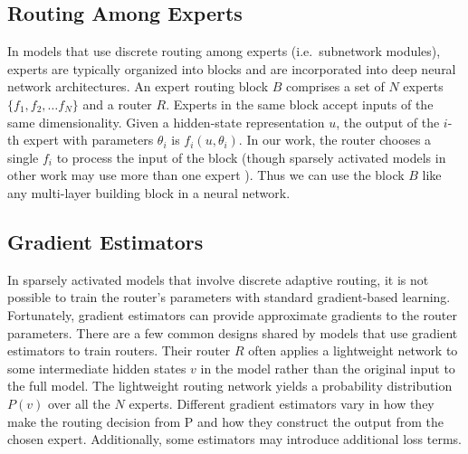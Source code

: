 \documentclass{article}
\theoremstyle{plain}
\theoremstyle{definition}
\theoremstyle{remark}
\begin{document}
\subsection{Routing Among Experts}

In models that use discrete routing among experts (i.e.\ subnetwork modules), experts are typically organized into blocks and are incorporated into deep neural network architectures. 
An expert routing block $B$ comprises a set of $N$ experts $\{f_1, f_2, \dots f_N\}$ and a router $R$. 
Experts in the same block accept inputs of the same dimensionality.
Given a hidden-state representation $u$, the output of the $i$-th expert with parameters $\theta_i$ is $f_i(u, \theta_i)$.  
In our work, the router chooses a single $f_i$ to process the input of the block (though sparsely activated models in other work may use more than one expert \citep{shazeer2017outrageously, du2022glam}). %
Thus we can use the block $B$ like any multi-layer building block in a neural network. %

\subsection{Gradient Estimators}
\label{sec:estimators}

In sparsely activated models that involve discrete adaptive routing, it is not possible to train the router's parameters with standard gradient-based learning.
Fortunately, gradient estimators can provide approximate gradients to the router parameters.
There are a few common designs shared by models that use gradient estimators to train routers. 
Their router $R$ often applies a lightweight network to some intermediate hidden states $v$ in the model rather than the original input to the full model. 
The lightweight routing network yields a probability distribution $P(v)$ over all the $N$ experts. 
Different gradient estimators vary in how they make the routing decision from P and how they construct the output from the chosen expert. 
Additionally, some estimators may introduce additional loss terms.
\end{document}
